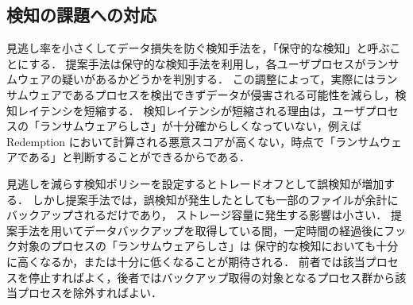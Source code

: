 \subsection{検知の課題への対応}
見逃し率を小さくしてデータ損失を防ぐ検知手法を，「保守的な検知」と呼ぶことにする．
提案手法は保守的な検知手法を利用し，各ユーザプロセスがランサムウェアの疑いがあるかどうかを判別する．
この調整によって，実際にはランサムウェアであるプロセスを検出できずデータが侵害される可能性を減らし，検知レイテンシを短縮する．
検知レイテンシが短縮される理由は，ユーザプロセスの「ランサムウェアらしさ」が十分確からしくなっていない，例えばRedemption \cite{kharraz2017redemption}
において計算される悪意スコアが高くない，時点で「ランサムウェアである」と判断することができるからである．

見逃しを減らす検知ポリシーを設定するとトレードオフとして誤検知が増加する．
しかし提案手法では，誤検知が発生したとしても一部のファイルが余計にバックアップされるだけであり，
ストレージ容量に発生する影響は小さい．
提案手法を用いてデータバックアップを取得している間，一定時間の経過後にフック対象のプロセスの「ランサムウェアらしさ」は
保守的な検知においても十分に高くなるか，または十分に低くなることが期待される．
前者では該当プロセスを停止すればよく，後者ではバックアップ取得の対象となるプロセス群から該当プロセスを除外すればよい．



